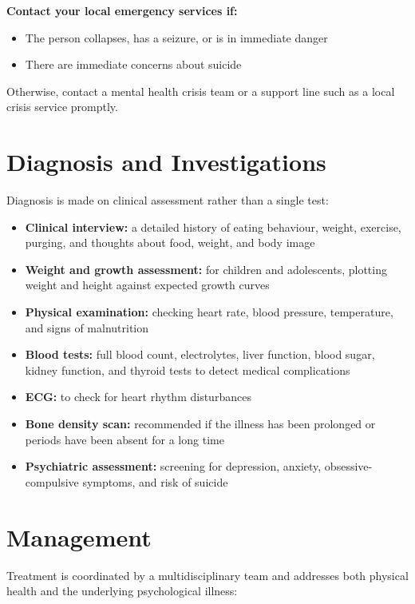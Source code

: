 \textbf{Contact your local emergency services if:}
\begin{itemize}
    \item The person collapses, has a seizure, or is in immediate danger
    \item There are immediate concerns about suicide
\end{itemize}

Otherwise, contact a mental health crisis team or a support line such as a local crisis service promptly.

\section*{Diagnosis and Investigations}
Diagnosis is made on clinical assessment rather than a single test:

\begin{itemize}
    \item \textbf{Clinical interview:} a detailed history of eating behaviour, weight, exercise, purging, and thoughts about food, weight, and body image
    \item \textbf{Weight and growth assessment:} for children and adolescents, plotting weight and height against expected growth curves
    \item \textbf{Physical examination:} checking heart rate, blood pressure, temperature, and signs of malnutrition
    \item \textbf{Blood tests:} full blood count, electrolytes, liver function, blood sugar, kidney function, and thyroid tests to detect medical complications
    \item \textbf{ECG:} to check for heart rhythm disturbances
    \item \textbf{Bone density scan:} recommended if the illness has been prolonged or periods have been absent for a long time
    \item \textbf{Psychiatric assessment:} screening for depression, anxiety, obsessive-compulsive symptoms, and risk of suicide
\end{itemize}

\section*{Management}
Treatment is coordinated by a multidisciplinary team and addresses both physical health and the underlying psychological illness:

